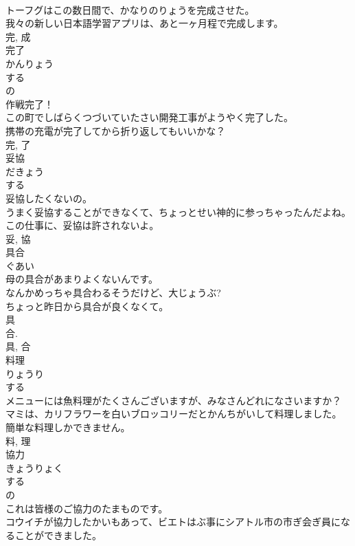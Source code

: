 \documentclass[8pt]{extreport}
\begin{document}
\begin{CJK}{UTF8}{min}
\\	トーフグはこの数日間で、かなりのりょうを完成させた。	
\\	我々の新しい日本語学習アプリは、あと一ヶ月程で完成します。	
\\	完, 成	
\\	完了	
\\	かんりょう	
\\	する 
\\	の 
\\	作戦完了！	
\\	この町でしばらくつづいていたさい開発工事がようやく完了した。	
\\	携帯の充電が完了してから折り返してもいいかな？	
\\	完, 了	
\\	妥協	
\\	だきょう	
\\	する 
\\	妥協したくないの。	
\\	うまく妥協することができなくて、ちょっとせい神的に参っちゃったんだよね。	
\\	この仕事に、妥協は許されないよ。	
\\	妥, 協	
\\	具合	
\\	ぐあい	
\\	母の具合があまりよくないんです。	
\\	なんかめっちゃ具合わるそうだけど、大じょうぶ?	
\\	ちょっと昨日から具合が良くなくて。	
\\	具 
\\	合. 
\\	具, 合	
\\	料理	
\\	りょうり	
\\	する 
\\	メニューには魚料理がたくさんございますが、みなさんどれになさいますか？	
\\	マミは、カリフラワーを白いブロッコリーだとかんちがいして料理しました。	
\\	簡単な料理しかできません。	
\\	料, 理	
\\	協力	
\\	きょうりょく	
\\	する 
\\	の 
\\	これは皆様のご協力のたまものです。	
\\	コウイチが協力したかいもあって、ビエトはぶ事にシアトル市の市ぎ会ぎ員になることができました。	

\end{CJK}
\end{document}
